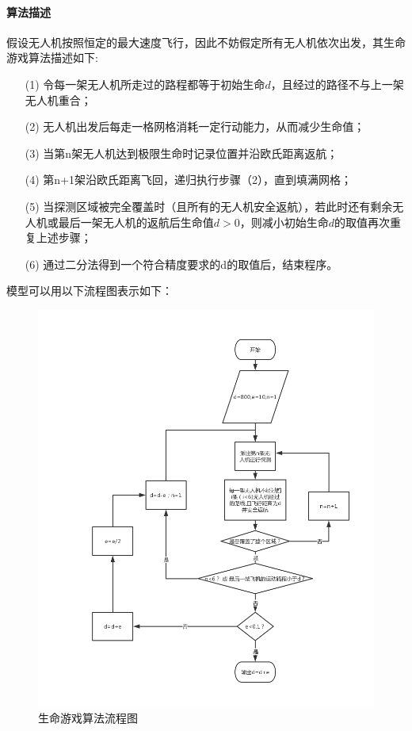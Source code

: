 \documentclass{whutmod}
\begin{document}
	\paragraph{算法描述}
	假设无人机按照恒定的最大速度飞行，因此不妨假定所有无人机依次出发，其生命游戏算法描述如下:
	
	\begin{itemize}
		\item [(1)]
		令每一架无人机所走过的路程都等于初始生命$d$，且经过的路径不与上一架无人机重合；
		\item [(2)] 
		无人机出发后每走一格网格消耗一定行动能力，从而减少生命值；
		\item [(3)] 当第n架无人机达到极限生命时记录位置并沿欧氏距离返航；
		\item [(4)] 第n+1架沿欧氏距离飞回，递归执行步骤（2），直到填满网格；
			\item [(5)] 当探测区域被完全覆盖时（且所有的无人机安全返航），若此时还有剩余无人机或最后一架无人机的返航后生命值$d>0$，则减小初始生命$d$的取值再次重复上述步骤；
			\item [(6)] 通过二分法得到一个符合精度要求的d的取值后，结束程序。
\end{itemize}
	
	模型可以用以下流程图表示如下：
	\begin{figure}[H]
		\centering
		\includegraphics[width=\textwidth]{figures/lct.png}
		\caption{生命游戏算法流程图}\label{lct}
	\end{figure}
\end{document}
